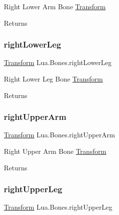 Right Lower Arm Bone \mbox{\hyperlink{class_lua_1_1_transform}{Transform}} 

\begin{DoxyReturn}{Returns}

\end{DoxyReturn}
\mbox{\label{class_lua_1_1_bones_a7322bb4e06909a72de8cb7899bbdda28}} 
\subsubsection{\texorpdfstring{rightLowerLeg}{rightLowerLeg}}
{\footnotesize\ttfamily \mbox{\hyperlink{class_lua_1_1_transform}{Transform}} Lua.\+Bones.\+right\+Lower\+Leg\hspace{0.3cm}{\ttfamily [get]}}



Right Lower Leg Bone \mbox{\hyperlink{class_lua_1_1_transform}{Transform}} 

\begin{DoxyReturn}{Returns}

\end{DoxyReturn}
\mbox{\label{class_lua_1_1_bones_ae5b640e142fcbe64ab63218e48bc5271}} 
\subsubsection{\texorpdfstring{rightUpperArm}{rightUpperArm}}
{\footnotesize\ttfamily \mbox{\hyperlink{class_lua_1_1_transform}{Transform}} Lua.\+Bones.\+right\+Upper\+Arm\hspace{0.3cm}{\ttfamily [get]}}



Right Upper Arm Bone \mbox{\hyperlink{class_lua_1_1_transform}{Transform}} 

\begin{DoxyReturn}{Returns}

\end{DoxyReturn}
\mbox{\label{class_lua_1_1_bones_a2192099d2fee781ee13c3591caa8c78c}} 
\subsubsection{\texorpdfstring{rightUpperLeg}{rightUpperLeg}}
{\footnotesize\ttfamily \mbox{\hyperlink{class_lua_1_1_transform}{Transform}} Lua.\+Bones.\+right\+Upper\+Leg\hspace{0.3cm}{\ttfamily [get]}}



